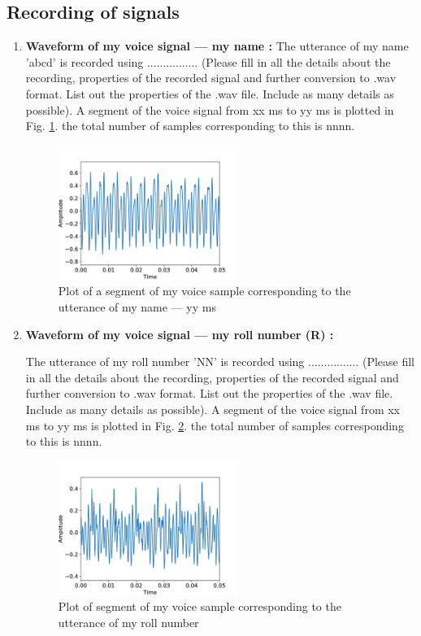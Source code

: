   \subsection{Recording of signals}
  \begin{enumerate}
      \item  \textbf{Waveform of my voice signal --- my name  :}
      The utterance of my name 'abcd' is recorded using ................ (Please fill in all the details about the recording, properties of the recorded signal and further conversion to .wav format. List out the properties of the .wav file. Include as many details as possible). A segment of the voice signal from xx ms to yy ms is plotted in Fig. \ref{fig1}. the total number of samples corresponding to this is nnnn. 
      
    \begin{figure} [h]
    \centering 
    \includegraphics[width=0.55\textwidth]{edit/healthy_signal_plot.png}
 \caption{Plot of a segment of my voice sample corresponding to the utterance of my name --- yy ms}
 \label{fig1} 
 \end{figure}
 

      \item  \textbf{Waveform of my voice signal --- my roll number (R) :}
  
  The utterance of my roll number 'NN' is recorded using ................ (Please fill in all the details about the recording, properties of the recorded signal and further conversion to .wav format. List out the properties of the .wav file. Include as many details as possible). A segment of the voice signal from xx ms to yy ms is plotted in Fig. \ref{fig2}. the total number of samples corresponding to this is nnnn.
      
       \begin{figure}[h]
    \centering
    \includegraphics[width=0.55\textwidth]{edit/leukoplakia_signal_plot.png}
 \caption{Plot of segment of my voice sample corresponding to the utterance of my roll number}
 \label{fig2} 
 \end{figure}
      

\end{enumerate}
